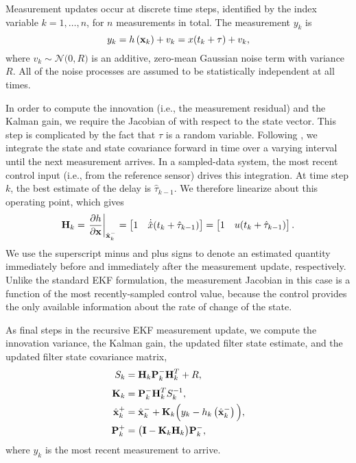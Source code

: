 \documentclass[letterpaper,10pt,conference]{ieeeconf}
\theoremstyle{definition}
\begin{document}
Measurement updates occur at discrete time steps, identified by the index variable $k = 1, \dots, n$, for $n$ measurements in total.
%
The measurement $y_{k}$ is
%
\begin{equation}
\label{eqn:ekf_meas}
y_{k} = h\left(\boldsymbol{\mathbf{x}}_{k}\right) + v_{k} = x(t_{k} + \tau) + v_{k},
\end{equation}
%
where $v_{k} \sim \mathcal{N}\big(0, R\big)$ is an additive, zero-mean Gaussian noise term with variance $R$.
%
All of the noise processes are assumed to be statistically independent at all times.

In order to compute the innovation (i.e., the measurement residual) and the Kalman gain, we require the Jacobian of  with respect to the state vector.
%
This step is complicated by the fact that $\tau$ is a random variable. 
%
Following \cite{2014_Li_Online}, we integrate the state and state covariance forward in time over a varying interval until the next measurement arrives.
%
In a sampled-data system, the most recent control input (i.e., from the reference sensor) drives this integration.
%
At time step $k$, the best estimate of the delay is $\hat{\tau}_{k - 1}$.
%
We therefore linearize  about this operating point, which gives
%
\begin{equation}
\matr{H}_{k} =
\left.\frac{\partial h}{\partial \mathbf{x}}\right|_{\hat{\mathbf{x}}^{-}_{k}} = 
\bbm
1 & \dot{\hat{x}}(t_{k} + \hat{\tau}_{k - 1})
\ebm =
%
\bbm
1 & u(t_{k} + \hat{\tau}_{k - 1})
\ebm.
\end{equation}
%
We use the superscript minus and plus signs to denote an estimated quantity immediately before and immediately after the measurement update, respectively.
%
Unlike the standard EKF formulation, the measurement Jacobian in this case is a function of the most recently-sampled control value, because the control provides the only available information about the rate of change of the state.

As final steps in the recursive EKF measurement update, we compute the innovation variance, the Kalman gain, the updated filter state estimate, and the updated filter state covariance matrix,
%
\begin{align}
\label{eqn:innovation_var}
S_{k} & = \boldsymbol{\mathbf{H}}_{k}\boldsymbol{\mathbf{P}}_{k}^{-}\boldsymbol{\mathbf{H}}_{k}^{T} + R, \\[1mm]
\label{eqn:ekf_gain}
\boldsymbol{\mathbf{K}}_{k} & = 
\boldsymbol{\mathbf{P}}_{k}^{-}\boldsymbol{\mathbf{H}}_{k}^{T}
S^{-1}_{k}, \\
\label{eqn:ekf_state_update}
\hat{\boldsymbol{\mathbf{x}}}_{k}^{+} & =
\hat{\boldsymbol{\mathbf{x}}}_{k}^{-} + 
\boldsymbol{\mathbf{K}}_{k}\Big(y_{k}-h_{k}\left(\hat{\boldsymbol{\mathbf{x}}}_{k}^{-}\right)\Big), \\
\label{eqn:ekf_covar_update}
\boldsymbol{\mathbf{P}}_{k}^{+} & =
\big(\boldsymbol{\mathbf{I}} - \boldsymbol{\mathbf{K}}_{k}\boldsymbol{\mathbf{H}}_{k}\big)\boldsymbol{\mathbf{P}}_{k}^{-},
\end{align}
%
where $y_{k}$ is the most recent measurement to arrive.
\end{document}
